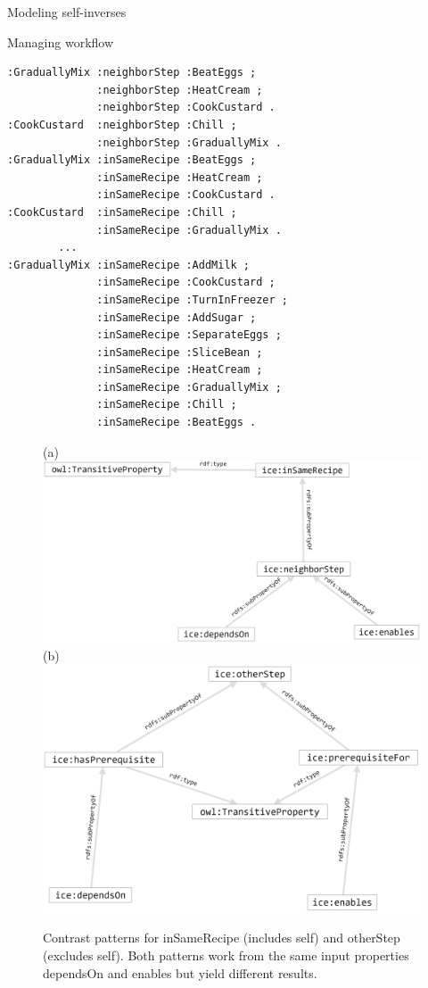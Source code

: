 \begin{challenge}{Modeling self-inverses}
\begin{challenge}{Managing workflow}
\begin{lstlisting}
:GraduallyMix :neighborStep :BeatEggs ;
              :neighborStep :HeatCream ;
              :neighborStep :CookCustard .
:CookCustard  :neighborStep :Chill ;
              :neighborStep :GraduallyMix .
:GraduallyMix :inSameRecipe :BeatEggs ;
              :inSameRecipe :HeatCream ;
              :inSameRecipe :CookCustard .
:CookCustard  :inSameRecipe :Chill ;
              :inSameRecipe :GraduallyMix .
        ...
:GraduallyMix :inSameRecipe :AddMilk ;
              :inSameRecipe :CookCustard ;
              :inSameRecipe :TurnInFreezer ;
              :inSameRecipe :AddSugar ;
              :inSameRecipe :SeparateEggs ;
              :inSameRecipe :SliceBean ;
              :inSameRecipe :HeatCream ;
              :inSameRecipe :GraduallyMix ;
              :inSameRecipe :Chill ;
              :inSameRecipe :BeatEggs .
\end{lstlisting}



\begin{figure}
\centering
(a)
\includegraphics[width=5in]{SWWOv3/media/ch9/figure9-8a.png}
(b)
\includegraphics[width=5in]{SWWOv3/media/ch9/figure9-8b.png}
\caption{Contrast patterns for inSameRecipe (includes self) and otherStep
(excludes self). Both patterns work from the same input properties
dependsOn and enables but yield different results.}
\label{fig:ch9.8}
\end{figure}




\end{challenge}
\end{challenge}
